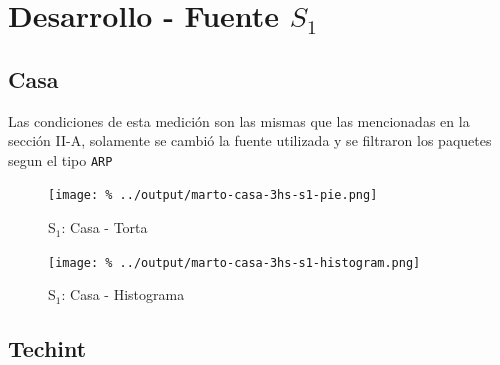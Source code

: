 \documentclass[final,narroweqnarray,inline]{ieee}
\begin{document}
\clearpage
\section{Desarrollo - Fuente $S_1$}
  \subsection{Casa}

  Las condiciones de esta medición son las mismas que las mencionadas en la
  sección II-A, solamente se cambió la fuente utilizada y se filtraron los
  paquetes segun el tipo \texttt{ARP}

    \begin{figure}[H]\begin{center}
      \texttt{[image: \%
      ../output/marto-casa-3hs-s1-pie.png]}
      \vspace{-2em}
      \caption{S$_1$: Casa - Torta}
      \label{marto-casa-3hs-s1-pie}
    \end{center}\end{figure}

    \begin{figure}[H]\begin{center}
      \texttt{[image: \%
      ../output/marto-casa-3hs-s1-histogram.png]}
      \vspace{-2em}
      \caption{S$_1$: Casa - Histograma}
      \label{marto-casa-3hs-s1-histogram}
    \end{center}\end{figure}	


  
  \subsection{Techint}
\end{document}
